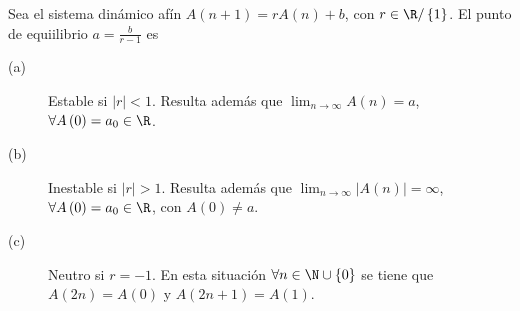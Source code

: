 \begin{ftheorem}[]
	\normalfont Sea el sistema dinámico afín $\displaystyle A\left(n+1\right) = rA\left(n\right) + b $, con $\displaystyle r \in \R / \left\{ 1\right\} $. El punto de equiilibrio $\displaystyle a = \frac{b}{r-1} $ es
	\begin{description}
	\item[(a)] Estable si $\displaystyle \left|r\right| < 1 $. Resulta además que $\displaystyle \lim_{n \to \infty}A\left(n\right) = a $, $\displaystyle \forall A\left(0\right)=a_{0} \in \R$.
	\item[(b)] Inestable si $\displaystyle \left|r\right| > 1 $. Resulta además que $\displaystyle \lim_{n \to \infty} \left|A\left(n\right)\right| = \infty$, $\displaystyle \forall A\left(0\right) = a_{0} \in \R $, con $\displaystyle A\left(0\right) \neq a $. 
	\item[(c)] Neutro si $\displaystyle r = - 1 $. En esta situación $\displaystyle \forall n \in \N\cup \left\{ 0\right\}  $ se tiene que $\displaystyle A\left(2n\right) = A\left(0\right) $ y $\displaystyle A\left(2n+1\right) = A\left(1\right) $. 
	\end{description}
\end{ftheorem}
